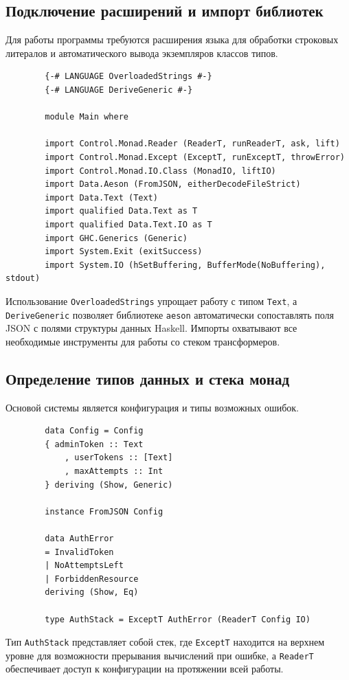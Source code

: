 \documentclass[a4paper, final]{article}
\begin{document}
	\subsection{Подключение расширений и импорт библиотек}
	Для работы программы требуются расширения языка для обработки строковых литералов и автоматического вывода экземпляров классов типов.
	
	\begin{lstlisting}
		{-# LANGUAGE OverloadedStrings #-}
		{-# LANGUAGE DeriveGeneric #-}
		
		module Main where
		
		import Control.Monad.Reader (ReaderT, runReaderT, ask, lift)
		import Control.Monad.Except (ExceptT, runExceptT, throwError)
		import Control.Monad.IO.Class (MonadIO, liftIO)
		import Data.Aeson (FromJSON, eitherDecodeFileStrict)
		import Data.Text (Text)
		import qualified Data.Text as T
		import qualified Data.Text.IO as T
		import GHC.Generics (Generic)
		import System.Exit (exitSuccess)
		import System.IO (hSetBuffering, BufferMode(NoBuffering), stdout)
	\end{lstlisting}
	Использование \texttt{OverloadedStrings} упрощает работу с типом \texttt{Text}, а \texttt{DeriveGeneric} позволяет библиотеке \texttt{aeson} автоматически сопоставлять поля JSON с полями структуры данных Haskell. Импорты охватывают все необходимые инструменты для работы со стеком трансформеров.
	
	\subsection{Определение типов данных и стека монад}
	Основой системы является конфигурация и типы возможных ошибок.
	
	\begin{lstlisting}
		data Config = Config
		{ adminToken :: Text
			, userTokens :: [Text]
			, maxAttempts :: Int
		} deriving (Show, Generic)
		
		instance FromJSON Config
		
		data AuthError
		= InvalidToken
		| NoAttemptsLeft
		| ForbiddenResource
		deriving (Show, Eq)
		
		type AuthStack = ExceptT AuthError (ReaderT Config IO)
	\end{lstlisting}
	Тип \texttt{AuthStack} представляет собой стек, где \texttt{ExceptT} находится на верхнем уровне для возможности прерывания вычислений при ошибке, а \texttt{ReaderT} обеспечивает доступ к конфигурации на протяжении всей работы.
	
\end{document}

